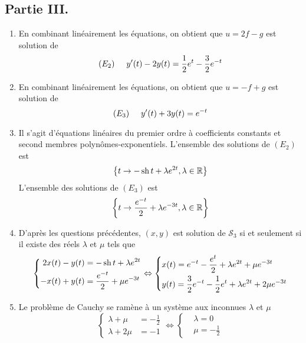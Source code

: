 \subsection*{Partie III.}
\begin{enumerate}
 \item En combinant linéairement les équations, on obtient que $u=2f-g$ est solution de
\begin{displaymath}
 (E_2)\hspace{0.5cm} y'(t)-2y(t) = \frac{1}{2}e^t -\frac{3}{2}e^{-t}
\end{displaymath}
 \item  En combinant linéairement les équations, on obtient que $u=-f+g$ est solution de
\begin{displaymath}
 (E_3)\hspace{0.5cm} y'(t)+3y(t) = e^{-t}
\end{displaymath}

 \item Il s'agit d'équations linéaires du premier ordre à coefficients constants et second membres polynômes-exponentiels. L'ensemble des solutions de $(E_2)$ est
\begin{displaymath}
 \left\lbrace
t\rightarrow -\operatorname{sh} t +\lambda e^{2t}, \lambda \in \mathbb{R}
 \right\rbrace 
\end{displaymath}
 L'ensemble des solutions de $(E_3)$ est
\begin{displaymath}
 \left\lbrace
t\rightarrow \frac{e^{-t}}{2} +\lambda e^{-3t}, \lambda \in \mathbb{R}
 \right\rbrace 
\end{displaymath}

 \item D'après les questions précédentes, $(x,y)$ est solution de $\mathcal{S}_3$ si et seulement si il existe des réels $\lambda$ et $\mu$ tels que
\begin{displaymath}
 \left\lbrace 
\begin{aligned}
2x(t)-y(t) &= -\operatorname{sh} t + \lambda e^{2t} \\
-x(t) + y(t) &= \frac{e^{-t}}{2} + \mu e^{-3t} 
\end{aligned}
\right. 
\Leftrightarrow
\left\lbrace 
\begin{aligned}
&x(t) = e^{-t}-\frac{e^{t}}{2}+\lambda e^{2t}+\mu e^{-3t} \\
&y(t) = \frac{3}{2}e^{-t}-\frac{1}{2}e^t+\lambda e^{2t}+2\mu e^{-3t} 
\end{aligned}
\right. 
\end{displaymath}
\item Le problème de Cauchy se ramène à un système aux inconnues $\lambda$ et $\mu$ 
\begin{displaymath}
 \left\lbrace 
\begin{aligned}
 \lambda + \mu &= -\frac{1}{2} \\
 \lambda + 2\mu &= -1
\end{aligned}
\right. 
  \Leftrightarrow
\left\lbrace 
\begin{aligned}
 &\lambda =0 \\ &\mu = -\frac{1}{2}
\end{aligned}
\right. 
\end{displaymath}
\end{enumerate}
